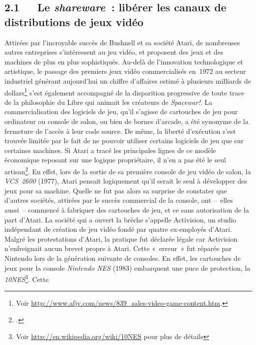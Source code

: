\documentclass{FramateX}
\begin{document}
\begin{refsection}
\subsection*{2.1~~~Le \textit{shareware~}: libérer les canaux de distributions de jeux vidéo}
{}



Attirées par l'incroyable succès de Bushnell et sa société
 Atari, de nombreuses autres
entreprises s'intéressent au jeu vidéo, et proposent des jeux et des
machines de plus en plus sophistiqués. Au-delà de l'innovation
technologique et artistique, le passage des premiers jeux vidéo
commercialisés en~1972 au secteur industriel générant aujourd'hui un
chiffre d'affaires estimé à plusieurs milliards de
dollars\footnote{Voir \url{http://www.afjv.com/news/839_sales-video-game-content.htm}.} s'est également accompagné de la disparition
progressive de toute trace de la philosophie du Libre qui animait les
créateurs de \textit{Spacewar!}. La
commercialisation des logiciels de jeu, qu'il s'agisse de cartouches de
jeu pour ordinateur ou console de salon, ou bien de bornes d'arcade, a
été synonyme de la fermeture de l'accès à leur code source. De même, la
liberté d'exécution s'est trouvée limitée par le fait de ne pouvoir
utiliser certains logiciels de jeu que sur certaines machines. Si
 Atari a tracé les principales lignes
de ce modèle économique reposant sur une logique propriétaire, il n'en
a pas été le seul artisan\footnote{\cite{kentultimate2001}.}. En effet, lors de la sortie de
sa première console de jeu vidéo de salon, la
\textit{VCS~2600} (1977), Atari pensait logiquement qu'il
serait le seul à développer des jeux pour sa machine. Quelle ne fut pas
alors sa surprise de constater que d'autres sociétés, attirées par le
succès commercial de la console, ont –~elles aussi~– commencé à
fabriquer des cartouches de jeu, et ce sans autorisation de la part
d'Atari. La société qui a ouvert la
brèche s'appelle Activision, un
studio indépendant de création de jeu vidéo fondé par quatre
ex-employés d'Atari. Malgré les
protestations d'Atari, la pratique
fut déclarée légale car Activision n'enfreignait aucun brevet propre à Atari. Cette «~erreur~» fut réparée
par  Nintendo lors de la génération
suivante de consoles. En effet, les cartouches de jeux pour la console
\textit{Nintendo NES} (1983) embarquent une
puce de protection, la \textit{10NES}\footnote{Voir
\url{http://en.wikipedia.org/wiki/10NES} pour plus de détails}. Cette

\end{refsection}
\end{document}
